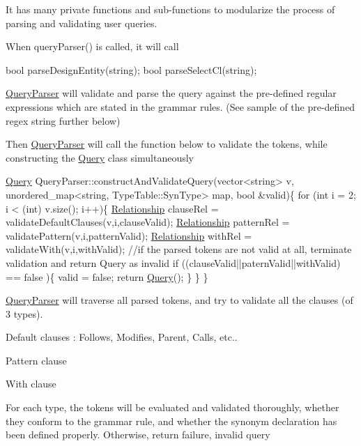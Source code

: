 It has many private functions and sub-\/functions to modularize the process of parsing and validating user queries.

When query\+Parser() is called, it will call 
\begin{DoxyCode}
\textcolor{keywordtype}{bool} parseDesignEntity(\textcolor{keywordtype}{string});
\textcolor{keywordtype}{bool} parseSelectCl(\textcolor{keywordtype}{string});
\end{DoxyCode}


\hyperlink{class_query_parser}{Query\+Parser} will validate and parse the query against the pre-\/defined regular expressions which are stated in the grammar rules. (See sample of the pre-\/defined regex string further below)

Then \hyperlink{class_query_parser}{Query\+Parser} will call the function below to validate the tokens, while constructing the \hyperlink{class_query}{Query} class simultaneously 
\begin{DoxyCode}
\hyperlink{class_query}{Query} QueryParser::constructAndValidateQuery(vector<string> v, unordered\_map<string,
       TypeTable::SynType> map, \textcolor{keywordtype}{bool} &valid)\{
   \textcolor{keywordflow}{for} (\textcolor{keywordtype}{int} i = 2; i < (int) v.size(); i++)\{
      \hyperlink{class_relationship}{Relationship} clauseRel = validateDefaultClauses(v,i,clauseValid);
      \hyperlink{class_relationship}{Relationship} patternRel = validatePattern(v,i,patternValid);
      \hyperlink{class_relationship}{Relationship} withRel = validateWith(v,i,withValid);
      \textcolor{comment}{//if the parsed tokens are not valid at all, terminate validation and return Query as invalid}
      \textcolor{keywordflow}{if} ((clauseValid||paternValid||withValid) == \textcolor{keyword}{false} )\{
         valid = \textcolor{keyword}{false};
         \textcolor{keywordflow}{return} \hyperlink{class_query}{Query}();
      \}
   \}
\}
\end{DoxyCode}


\hyperlink{class_query_parser}{Query\+Parser} will traverse all parsed tokens, and try to validate all the clauses (of 3 types).
\begin{DoxyItemize}
\item Default clauses \+: Follows, Modifies, Parent, Calls, etc..
\item Pattern clause
\item With clause
\end{DoxyItemize}

For each type, the tokens will be evaluated and validated thoroughly, whether they conform to the grammar rule, and whether the synonym declaration has been defined properly. Otherwise, return failure, invalid query

